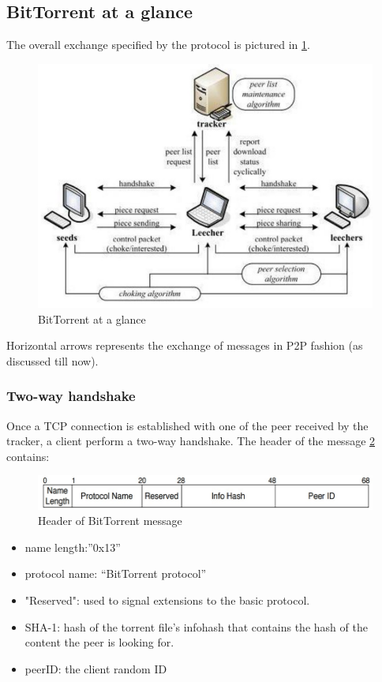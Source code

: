\documentclass[10pt,a4paper]{report}
\begin{document}
\subsection{BitTorrent at a glance}\label{sec:bittorrent-at-a-glance}
The overall exchange specified by the protocol is pictured in \ref{full-bitt}.
\begin{figure}[h!]
	\centering
	\includegraphics[scale=0.50]{images/Pasted image 20230311104808.png}
	\caption{BitTorrent at a glance}
	\label{full-bitt}
\end{figure}

Horizontal arrows represents the exchange of messages in P2P fashion (as discussed till now).
\subsubsection{Two-way handshake}\label{sec:two-way-handshake}
Once a TCP connection is established with one of the peer received by the tracker, a client perform a two-way handshake. The header of the message \ref{two-way-header} contains:
\begin{figure}
	\includegraphics[scale=0.50]{images/Pasted image 20230311105046.png}
	\caption{Header of BitTorrent message}
	\label{two-way-header}
\end{figure}

\begin{itemize}
	\item 
	name length:”0x13”
	\item 
	protocol name: “BitTorrent protocol”
	\item 
	"Reserved": used to signal extensions to the basic protocol. 
	\item 
	SHA-1: hash of the torrent file's infohash that contains the hash of the content the peer is looking for.
	\item 
	peerID: the client random ID
\end{itemize}
\end{document}

